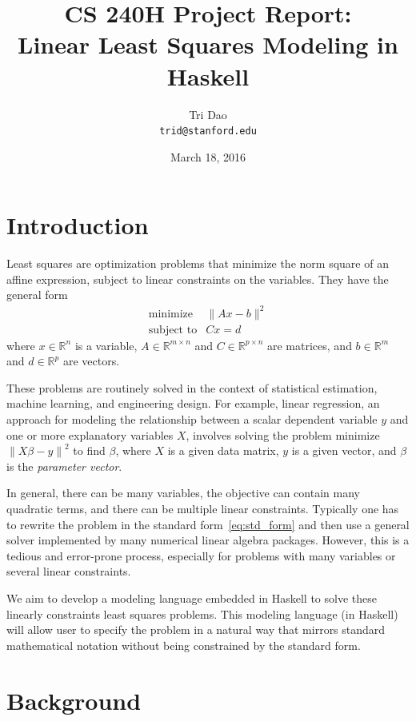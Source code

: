 \documentclass[12pt]{article}
\title{CS 240H Project Report: \\ Linear Least Squares Modeling in Haskell}
\author{Tri Dao \\ \texttt{trid@stanford.edu}}
\date{March 18, 2016}
\providecommand{\norm}[1]{\left\lVert#1\right\rVert}
\begin{document}
\maketitle

\section{Introduction}

Least squares are optimization problems that minimize the norm square
of an affine expression, subject to linear constraints on the variables.
They have the general form
\begin{equation}
  \begin{array}{ll}
    \mbox{minimize} & \|Ax-b\|^2 \\
    \mbox{subject to} & Cx = d
  \end{array}
  \label{eq:std_form}
\end{equation}
where $x \in \mathbb{R}^{n}$ is a variable, $A \in \mathbb{R}^{m \times n}$ and
$C \in \mathbb{R}^{p \times n}$ are matrices, and $b \in \mathbb{R}^m$ and
$d \in \mathbb{R}^p$ are vectors.

These problems are routinely solved in the context of statistical estimation,
machine learning, and engineering design.
For example, linear regression, an approach for modeling the relationship
between a scalar dependent variable $y$ and one or more explanatory variables
$X$, involves solving the problem minimize $\norm{X \beta - y}^2$ to find
$\beta$, where $X$ is a given data matrix, $y$ is a given vector, and $\beta$ is
the \emph{parameter vector}.

In general, there can be many variables, the objective can contain many
quadratic terms, and there can be multiple linear constraints.
Typically one has to rewrite the problem in the standard
form~\eqref{eq:std_form} and then use a general solver implemented by many
numerical linear algebra packages.
However, this is a tedious and error-prone process, especially for problems with
many variables or several linear constraints.

We aim to develop a modeling language embedded in Haskell to solve these
linearly constraints least squares problems.
This modeling language (in Haskell) will allow user to specify the problem in a
natural way that mirrors standard mathematical notation without being
constrained by the standard form.

\section{Background}
\end{document}
